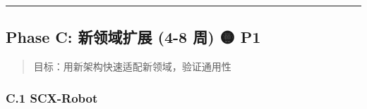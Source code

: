 \documentclass[
  12pt,
]{ctexart}
\begin{document}
\begin{center}\rule{0.5\linewidth}{0.5pt}\end{center}

\subsection{Phase C: 新领域扩展 (4-8 周) 🟡
P1}\label{phase-c-ux65b0ux9886ux57dfux6269ux5c55-4-8-ux5468-p1}

\begin{quote}
目标：用新架构快速适配新领域，验证通用性
\end{quote}

\subsubsection{C.1 SCX-Robot}\label{c.1-scx-robot}
\end{document}
